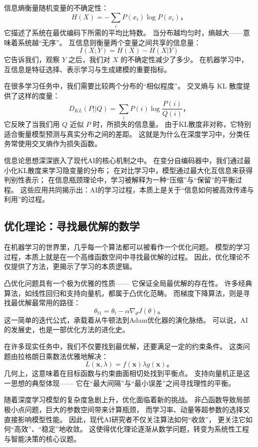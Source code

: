 信息熵衡量随机变量的不确定性：
$$H(X) = -\sum_{i} P(x_i) \log P(x_i)，$$
它描述了系统在最优编码下所需的平均比特数。  
当分布越均匀时，熵越大——意味着系统越“无序”。  
互信息则衡量两个变量之间共享的信息量：
$$I(X;Y) = H(X) - H(X|Y)$$
它告诉我们，观察 $Y$ 之后，我们对 $X$ 的不确定性减少了多少。  
在机器学习中，互信息是特征选择、表示学习与生成建模的重要指标。

在很多学习任务中，我们需要比较两个分布的“相似程度”。  
交叉熵与 KL 散度提供了这样的度量：
$$ D_{KL}(P||Q) = \sum_i P(i)\log\frac{P(i)}{Q(i)}，$$
它反映了当我们用 $Q$ 近似 $P$ 时，所损失的信息量。  
由于KL散度非对称，它特别适合衡量模型预测与真实分布之间的差距。  
这就是为什么在深度学习中，分类任务常使用交叉熵作为损失函数。

信息论思想深深嵌入了现代AI的核心机制之中。  
在变分自编码器中，我们通过最小化KL散度来学习隐变量的分布；  
在对比学习中，模型通过最大化互信息来获得判别性表示；  
在信息瓶颈理论中，学习被解释为一种“压缩”与“保留”的平衡过程。  
这些应用共同揭示出：AI的学习过程，本质上是关于“信息如何被高效传递与利用”的过程。

\subsection{优化理论：寻找最优解的数学}

在机器学习的世界里，几乎每一个算法都可以被看作一个优化问题。  
模型的学习过程，本质上就是在一个高维函数空间中寻找最优解的过程。  
因此，优化理论不仅提供了方法，更揭示了学习的本质逻辑。

凸优化问题具有一个极为优雅的性质——  
它保证全局最优解的存在性。  
许多经典算法，如线性回归和支持向量机，都属于凸优化范畴。  
而梯度下降算法，则是寻找最优解最常用的路径：  
$$\theta_{t1} = \theta_t - \alpha \nabla_\theta J(\theta)。$$  
这一简单的迭代公式，承载着从牛顿法到Adam优化器的演化脉络。  
可以说，AI的发展史，也是一部优化方法的进化史。

在许多现实任务中，我们不仅要找到最优解，还要满足一定的约束条件。  
这类问题由拉格朗日乘数法优雅地解决：
$$L(\mathbf{x}, \lambda) = f(\mathbf{x})  \lambda g(\mathbf{x})。$$  
几何上，这意味着在目标函数与约束曲面相切处找到平衡点。  
支持向量机正是这一思想的典型体现——  
它在“最大间隔”与“最小误差”之间寻找理性的平衡。

随着深度学习模型的复杂度急剧上升，优化面临着新的挑战。  
非凸函数导致局部极小点问题，巨大的参数空间带来计算瓶颈，  
而学习率、动量等超参数的选择又直接影响模型性能。  
因此，现代AI研究者不仅关注算法如何“收敛”，  
更关注它如何“高效”、“稳定”地收敛。  
这使得优化理论逐渐从数学问题，转变为系统性工程与智能决策的核心议题。


